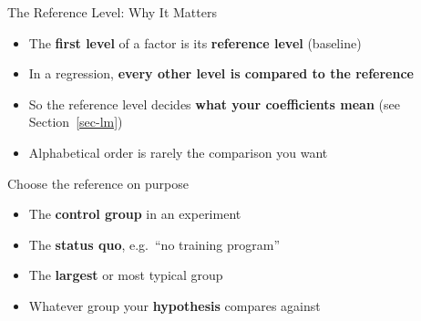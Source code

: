 \documentclass[
  ignorenonframetext,
  aspectratio=169,
]{beamer}
\providecommand{\tightlist}{%
  \setlength{\itemsep}{0pt}\setlength{\parskip}{0pt}}\usepackage{longtable,booktabs,array}
\begin{document}
\begin{frame}{The Reference Level: Why It Matters}
\protect\hypertarget{sec-reference}{}
\begin{itemize}
\tightlist
\item
  The \textbf{first level} of a factor is its \textbf{reference level}
  (baseline)
\item
  In a regression, \textbf{every other level is compared to the
  reference}
\item
  So the reference level decides \textbf{what your coefficients mean}
  (see Section~\ref{sec-lm})
\item
  Alphabetical order is rarely the comparison you want
\end{itemize}

\begin{exampleblock}{Choose the reference on purpose}
\protect\hypertarget{choose-the-reference-on-purpose}{}
\begin{itemize}
\tightlist
\item
  The \textbf{control group} in an experiment
\item
  The \textbf{status quo}, e.g.~``no training program''
\item
  The \textbf{largest} or most typical group
\item
  Whatever group your \textbf{hypothesis} compares against
\end{itemize}
\end{exampleblock}
\end{frame}
\end{document}
